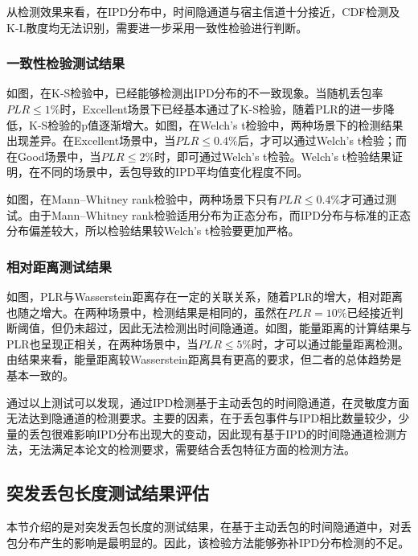 从检测效果来看，在IPD分布中，时间隐通道与宿主信道十分接近，CDF检测及K-L散度均无法识别，需要进一步采用一致性检验进行判断。

\subsubsection{一致性检验测试结果}
\label{chap:analyze:result:ipd:statistical}

如图，在K-S检验中，已经能够检测出IPD分布的不一致现象。当随机丢包率$PLR\le 1\%$时，Excellent场景下已经基本通过了K-S检验，随着PLR的进一步降低，K-S检验的p值逐渐增大。如图，在Welch's t检验中，两种场景下的检测结果出现差异。在Excellent场景中，当$PLR\le 0.4\%$后，才可以通过Welch's t检验；而在Good场景中，当$PLR\le 2\%$时，即可通过Welch's t检验。Welch's t检验结果证明，在不同的场景中，丢包导致的IPD平均值变化程度不同。

如图，在Mann–Whitney rank检验中，两种场景下只有$PLR\le 0.4\%$才可通过测试。由于Mann–Whitney rank检验适用分布为正态分布，而IPD分布与标准的正态分布偏差较大，所以检验结果较Welch's t检验要更加严格。

\subsubsection{相对距离测试结果}
\label{chap:analyze:result:ipd:distance}

如图，PLR与Wasserstein距离存在一定的关联关系，随着PLR的增大，相对距离也随之增大。在两种场景中，检测结果是相同的，虽然在$PLR=10\%$已经接近判断阈值，但仍未超过，因此无法检测出时间隐通道。如图，能量距离的计算结果与PLR也呈现正相关，在两种场景中，当$PLR\le 5\%$时，才可以通过能量距离检测。由结果来看，能量距离较Wasserstein距离具有更高的要求，但二者的总体趋势是基本一致的。

通过以上测试可以发现，通过IPD检测基于主动丢包的时间隐通道，在灵敏度方面无法达到隐通道的检测要求。主要的因素，在于丢包事件与IPD相比数量较少，少量的丢包很难影响IPD分布出现大的变动，因此现有基于IPD的时间隐通道检测方法，无法满足本论文的检测要求，需要结合丢包特征方面的检测方法。

\subsection{突发丢包长度测试结果评估}
\label{chap:analyze:result:burst}

本节介绍的是对突发丢包长度的测试结果，在基于主动丢包的时间隐通道中，对丢包分布产生的影响是最明显的。因此，该检验方法能够弥补IPD分布检测的不足。

